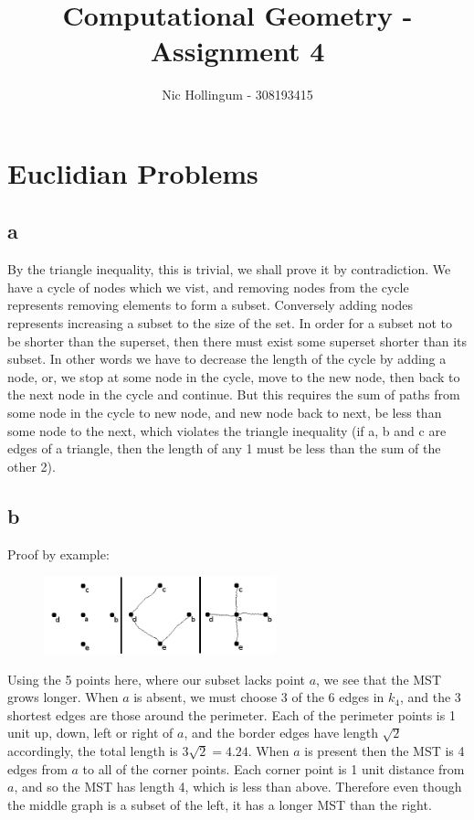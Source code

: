\documentclass{article}
\author{Nic Hollingum - 308193415}
\title{Computational Geometry - Assignment 4}
\begin{document}
\maketitle

\section {Euclidian Problems}

\subsection*{a}
By the triangle inequality, this is trivial, we shall prove it by contradiction.
We have a cycle of nodes which we vist, and removing nodes from the cycle represents removing elements to form a subset.
Conversely adding nodes represents increasing a subset to the size of the set.
In order for a subset not to be shorter than the superset, then there must exist some superset shorter than its subset.
In other words we have to decrease the length of the cycle by adding a node, or, we stop at some node in the cycle, move to the new node, then back to the next node in the cycle and continue.
But this requires the sum of paths from some node in the cycle to new node, and new node back to next, be less than some node to the next, which violates the triangle inequality (if a, b and c are edges of a triangle, then the length of any 1 must be less than the sum of the other 2).

\subsection*{b}
Proof by example:

\begin{figure}[htb]
\begin{center}
\leavevmode
\includegraphics[width=0.6\textwidth]{mst.png}
\end{center}
\end{figure}
\label{fig:mst}

Using the 5 points here, where our subset lacks point $a$, we see that the MST grows longer.
When $a$ is absent, we must choose 3 of the 6 edges in $k_4$, and the 3 shortest edges are those around the perimeter.
Each of the perimeter points is 1 unit up, down, left or right of $a$, and the border edges have length $\sqrt 2$ accordingly, the total length is $3 \sqrt 2 = 4.24$.
When $a$ is present then the MST is 4 edges from $a$ to all of the corner points.
Each corner point is 1 unit distance from $a$, and so the MST has length 4, which is less than above.
Therefore even though the middle graph is a subset of the left, it has a longer MST than the right.
\end{document}
